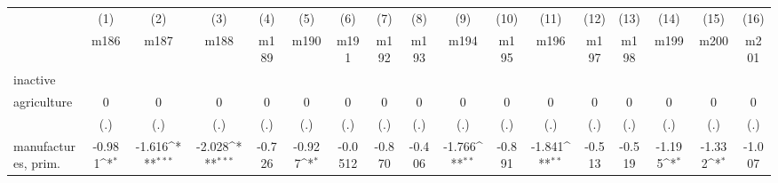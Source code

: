 {
\def\sym#1{\ifmmode^{#1}\else\(^{#1}\)\fi}
\begin{tabular}{l*{16}{c}}
\hline\hline
                    &\multicolumn{1}{c}{(1)}&\multicolumn{1}{c}{(2)}&\multicolumn{1}{c}{(3)}&\multicolumn{1}{c}{(4)}&\multicolumn{1}{c}{(5)}&\multicolumn{1}{c}{(6)}&\multicolumn{1}{c}{(7)}&\multicolumn{1}{c}{(8)}&\multicolumn{1}{c}{(9)}&\multicolumn{1}{c}{(10)}&\multicolumn{1}{c}{(11)}&\multicolumn{1}{c}{(12)}&\multicolumn{1}{c}{(13)}&\multicolumn{1}{c}{(14)}&\multicolumn{1}{c}{(15)}&\multicolumn{1}{c}{(16)}\\
                    &\multicolumn{1}{c}{m186}&\multicolumn{1}{c}{m187}&\multicolumn{1}{c}{m188}&\multicolumn{1}{c}{m189}&\multicolumn{1}{c}{m190}&\multicolumn{1}{c}{m191}&\multicolumn{1}{c}{m192}&\multicolumn{1}{c}{m193}&\multicolumn{1}{c}{m194}&\multicolumn{1}{c}{m195}&\multicolumn{1}{c}{m196}&\multicolumn{1}{c}{m197}&\multicolumn{1}{c}{m198}&\multicolumn{1}{c}{m199}&\multicolumn{1}{c}{m200}&\multicolumn{1}{c}{m201}\\
\hline
inactive            &                     &                     &                     &                     &                     &                     &                     &                     &                     &                     &                     &                     &                     &                     &                     &                     \\
agriculture         &           0         &           0         &           0         &           0         &           0         &           0         &           0         &           0         &           0         &           0         &           0         &           0         &           0         &           0         &           0         &           0         \\
                    &         (.)         &         (.)         &         (.)         &         (.)         &         (.)         &         (.)         &         (.)         &         (.)         &         (.)         &         (.)         &         (.)         &         (.)         &         (.)         &         (.)         &         (.)         &         (.)         \\
[1em]
manufactures, prim. &      -0.981\sym{*}  &      -1.616\sym{***}&      -2.028\sym{***}&      -0.726         &      -0.927\sym{*}  &     -0.0512         &      -0.870         &      -0.406         &      -1.766\sym{**} &      -0.891         &      -1.841\sym{**} &      -0.513         &      -0.519         &      -1.195\sym{*}  &      -1.332\sym{*}  &      -1.007         \\

\end{tabular}}
